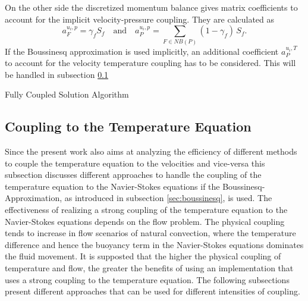 On the other side the discretized momentum balance gives matrix coefficients to account for the implicit velocity-pressure coupling. They are calculated as
\begin{displaymath}
  a_F^{u_i,p} =  \gamma_f S_f \quad \text{and} \quad a_P^{u_i,p} = \sum_{F \in NB(P)} (1-\gamma_f) \, S_f.
\end{displaymath}
If the Boussinesq approximation is used implicitly, an additional coefficient \(a_P^{u_i,T}\) to account for the velocity temperature coupling has to be considered. This will be handled in subsection \ref{sec:temperaturecoupling}

\begin{algorithm}
\label{al:coupled}
\caption{Fully Coupled Solution Algorithm}
\begin{algorithmic}
\Else
\EndIf
{}
\EndIf
\EndWhile
\end{algorithmic}
\end{algorithm}

\subsection{Coupling to the Temperature Equation}
\label{sec:temperaturecoupling}

Since the present work also aims at analyzing the efficiency of different methods to couple the temperature equation to the velocities and vice-versa this subsection discusses different approaches to handle the coupling of the temperature equation to the Navier-Stokes equations if the Boussinesq-Approximation, as introduced in subsection \ref{sec:boussinesq}, is used. The effectiveness of realizing a strong coupling of the temperature equation to the Navier-Stokes equations depends on the flow problem. The physical coupling tends to increase in flow scenarios of natural convection, where the temperature difference and hence the buoyancy term in the Navier-Stokes equations dominates the fluid movement. It is supposted that the higher the physical coupling of temperature and flow, the greater the benefits of using an implementation that uses a strong coupling to the temperature equation. The following subsections present different approaches that can be used for different intensities of coupling.
      
